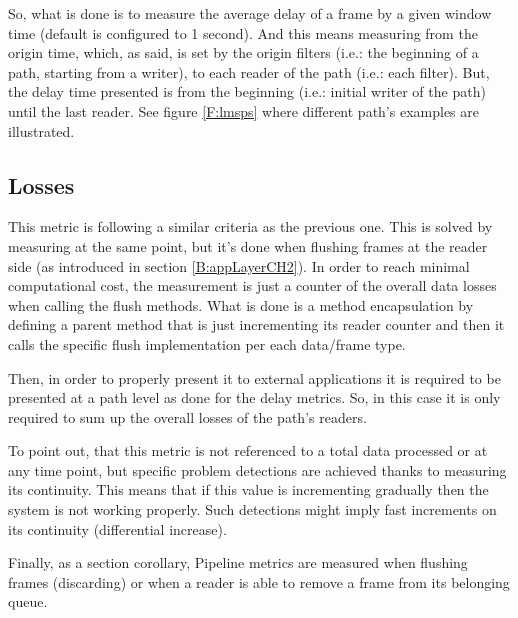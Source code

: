 So, what is done is to measure the average delay of a frame by a given window time (default is configured to 1 second). And this means measuring from the origin time, which, as said, is set by the origin filters (i.e.: the beginning of a path, starting from a writer), to each reader of the path (i.e.: each filter). But, the delay time presented is from the beginning (i.e.: initial writer of the path) until the last reader. See figure \ref{F:lmsps} where different path's examples are illustrated.

\subsection{Losses}

This metric is following a similar criteria as the previous one. This is solved by measuring at the same point, but it's done when flushing frames at the reader side (as introduced in section \ref{B:appLayerCH2}). In order to reach minimal computational cost, the measurement is just a counter of the overall data losses when calling the flush methods. What is done is a method encapsulation by defining a parent method that is just incrementing its reader counter and then it calls the specific flush implementation per each data/frame type.

Then, in order to properly present it to external applications it is required to be presented at a path level as done for the delay metrics. So, in this case it is only required to sum up the overall losses of the path's readers.

To point out, that this metric is not referenced to a total data processed or at any time point, but specific problem detections are achieved thanks to measuring its continuity. This means that if this value is incrementing gradually then the system is not working properly. Such detections might imply fast increments on its continuity (differential increase). 


Finally, as a section corollary, Pipeline metrics are measured when flushing frames (discarding) or when a reader is able to remove a frame from its belonging queue. 
